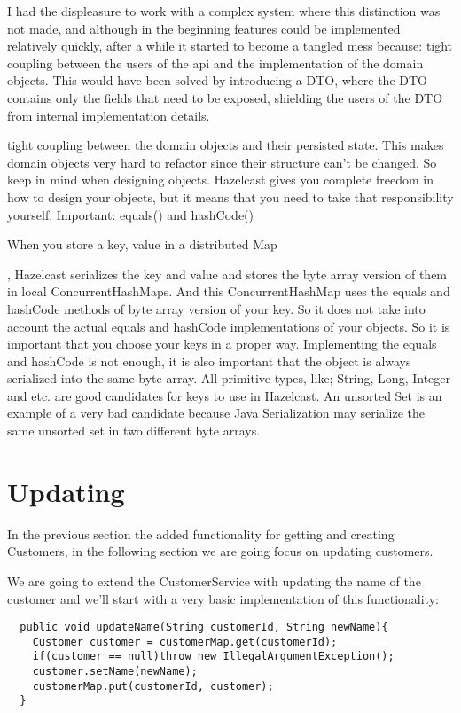 I had the displeasure to work with a complex system where this distinction was not made, and although in the beginning features could be implemented relatively quickly, after a while it started to become a tangled mess because:
tight coupling between the users of the api and the implementation of the domain objects. This would have been solved by introducing a DTO, where the DTO contains only the fields that need to be exposed, shielding the users of the DTO from internal implementation details.

tight coupling between the domain objects and their persisted state. This makes domain objects very hard to refactor since their structure can't be changed.
So keep in mind when designing objects. Hazelcast gives you complete freedom in how to design your objects, but it means that you need to take that responsibility yourself.
Important: equals() and hashCode()

When you store a key, value in a distributed Map

, Hazelcast serializes the key and value and stores the byte array version of them in local ConcurrentHashMaps. And this ConcurrentHashMap uses the equals and hashCode methods of byte array version of your key. So it does not take into account the actual equals and hashCode implementations of your objects. So it is important that you choose your keys in a proper way. Implementing the equals and hashCode is not enough, it is also important that the object is always serialized into the same byte array. All primitive types, like; String, Long, Integer and etc. are good candidates for keys to use in Hazelcast. An unsorted Set is an example of a very bad candidate because Java Serialization may serialize the same unsorted set in two different byte arrays.

\section{Updating}

In the previous section the added functionality for getting and creating Customers, in the following section we are going focus on updating customers. 

We are going to extend the CustomerService with updating the name of the customer and we'll start with a very basic implementation of this functionality:

\begin{verbatim}
  public void updateName(String customerId, String newName){
    Customer customer = customerMap.get(customerId);
    if(customer == null)throw new IllegalArgumentException();
    customer.setName(newName);
    customerMap.put(customerId, customer);
  }
\end{verbatim}

